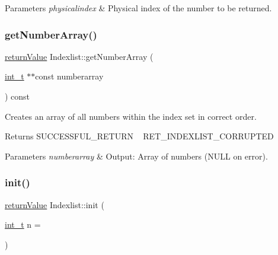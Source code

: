 \begin{DoxyParams}{Parameters}
{\em physicalindex} & Physical index of the number to be returned. \\
\hline
\end{DoxyParams}
\mbox{\label{class_indexlist_adbf88e12d610ba437fb4438d4a8af74f}} 
\subsubsection{\texorpdfstring{get\+Number\+Array()}{getNumberArray()}}
{\footnotesize\ttfamily \hyperlink{_message_handling_8hpp_a81d556f613bfbabd0b1f9488c0fa865e}{return\+Value} Indexlist\+::get\+Number\+Array (\begin{DoxyParamCaption}\item[{\hyperlink{_types_8hpp_ab6fd6105e64ed14a0c9281326f05e623}{int\+\_\+t} $\ast$$\ast$const}]{numberarray }\end{DoxyParamCaption}) const}

Creates an array of all numbers within the index set in correct order. \begin{DoxyReturn}{Returns}
S\+U\+C\+C\+E\+S\+S\+F\+U\+L\+\_\+\+R\+E\+T\+U\+RN ~\newline
 R\+E\+T\+\_\+\+I\+N\+D\+E\+X\+L\+I\+S\+T\+\_\+\+C\+O\+R\+R\+U\+P\+T\+ED 
\end{DoxyReturn}

\begin{DoxyParams}{Parameters}
{\em numberarray} & Output\+: Array of numbers (N\+U\+LL on error). \\
\hline
\end{DoxyParams}
\mbox{\label{class_indexlist_ab835188e0e58ae5fd081fbb16a9f859c}} 
\subsubsection{\texorpdfstring{init()}{init()}}
{\footnotesize\ttfamily \hyperlink{_message_handling_8hpp_a81d556f613bfbabd0b1f9488c0fa865e}{return\+Value} Indexlist\+::init (\begin{DoxyParamCaption}\item[{\hyperlink{_types_8hpp_ab6fd6105e64ed14a0c9281326f05e623}{int\+\_\+t}}]{n = {} }\end{DoxyParamCaption})}

